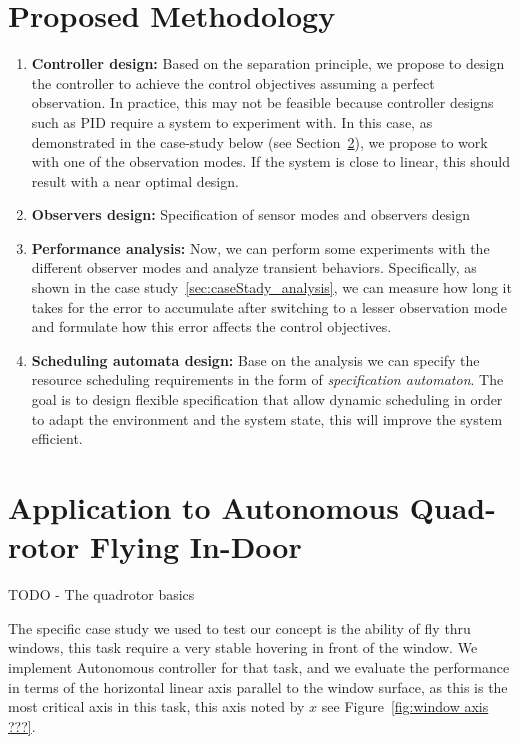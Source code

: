 \documentclass{sig-alternate-ipsn13}
\begin{document}
\section{Proposed Methodology}
\begin{enumerate}
    
    \item \textbf{Controller design:} Based on the separation principle, we propose to design the controller to achieve the control objectives assuming a perfect observation. In practice, this may not be feasible because controller designs such as PID require a system to experiment with. In this case, as demonstrated in the case-study below (see Section~\ref{sec:caseStady}), we propose to work with one of the observation modes. If the system is close to linear, this should result with a near optimal design.
    
    \item \textbf{Observers design:} Specification of sensor modes and observers design
    
    \item \textbf{Performance analysis:} Now, we can perform some experiments with the different observer modes and analyze transient behaviors. Specifically, as shown in the case study~\ref{sec:caseStady_analysis}, we can measure how long it takes for the error to accumulate after switching to a lesser observation mode and formulate how this error affects the control objectives.

    \item \textbf{Scheduling automata design:} Base on the analysis we can specify the resource scheduling requirements in the form of \textit{specification automaton}. The goal is to design flexible specification that allow dynamic scheduling in order to adapt the environment and the system state, this will improve the system efficient.

\end{enumerate}


\section{Application to Autonomous Quad-rotor Flying In-Door}
\label{sec:caseStady}


TODO - The quadrotor basics

The specific case study we used to test our concept is the ability of fly thru windows, this task require a very stable hovering in front of the window.
We implement Autonomous controller for that task, and we evaluate the performance in terms of the horizontal linear axis parallel to the window surface, as this is the most critical axis in this task, this axis noted by $x$ see Figure~\ref{fig:window axis ???}.
\end{document}
